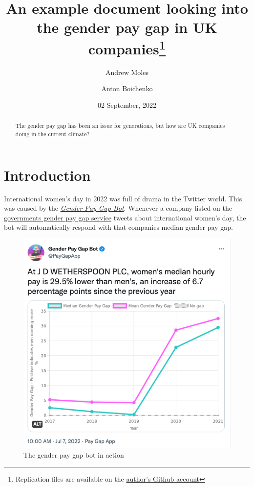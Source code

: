 \documentclass[
  11pt,
]{article}
\title{An example document looking into the gender pay gap in UK
companies\thanks{Replication files are available on the
\href{https://github.com/andrewmoles2/gender_pay_gap_example}{author's
Github account}}}
\author{Andrew Moles \and Anton Boichenko}
\date{02 September, 2022}
\begin{document}
\maketitle
\begin{abstract}
The gender pay gap has been an issue for generations, but how are UK
companies doing in the current climate?
\end{abstract}

\newpage

\raggedright
\newpage
\setcounter{tocdepth}{4}
\tableofcontents
\listoffigures
\listoftables

\newpage

\hypertarget{introduction}{%
\section{Introduction}\label{introduction}}

International women's day in 2022 was full of drama in the Twitter
world. This was caused by the
\href{https://genderpaygap.app/}{\emph{Gender Pay Gap Bot}}. Whenever a
company listed on the
\href{https://gender-pay-gap.service.gov.uk/}{governments gender pay gap
service} tweets about international women's day, the bot will
automatically respond with that companies median gender pay gap.

\begin{figure}

{\centering \includegraphics[width=0.7\linewidth]{pay_gap_bot} 

}

\caption{The gender pay gap bot in action}\label{fig:botimage}
\end{figure}
\end{document}
